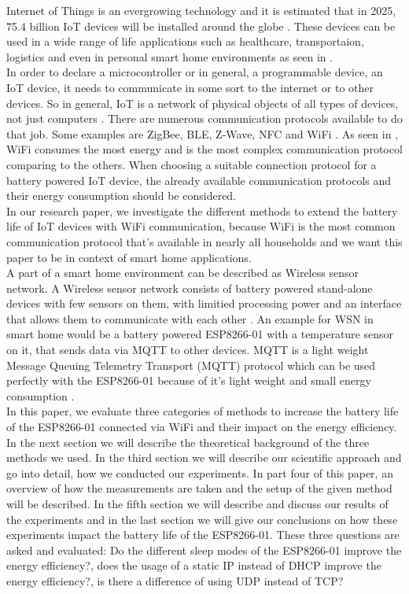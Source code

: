 Internet of Things is an evergrowing technology and it is estimated that in 2025, 75.4 billion IoT devices will be installed around the globe \cite{lucero2016iot}. These devices can be used in a wide range of life applications such as healthcare, transportaion, logistics and even in personal smart home environments as seen in \cite{6803174}.\\  
In order to declare a microcontroller or in general, a programmable device, an IoT device, it needs to communicate in some sort to the internet or to other devices. So in general, IoT is a network of physical objects of all types of devices, not just computers \cite{patel2016internet}. There are numerous communication protocols available to do that job. Some examples are ZigBee, BLE, Z-Wave, NFC and WiFi \cite{8079928}. As seen in \cite{8088226}, WiFi consumes the most energy and is the most complex communication protocol comparing to the others.  
When choosing a suitable connection protocol for a battery powered IoT device, the already available communication protocols and their energy consumption should be considered.\\
In our research paper, we investigate the different methods to extend the battery life of IoT devices with WiFi communication, because WiFi is the most common communication protocol that's available in nearly all households and we want this paper to be in context of smart home applications.\\
A part of a smart home environment can be described as Wireless sensor network. A Wireless sensor network consists of battery powered stand-alone devices with few sensors on them, with limitied processing power and an interface that allows them to communicate with each other \cite{wsn}. 
An example for WSN in smart home would be a battery powered ESP8266-01 with a temperature sensor on it, that sends data via MQTT to other devices.
MQTT is a light weight Message Queuing Telemetry Transport (MQTT) protocol which can be used perfectly with the ESP8266-01 because of it's light weight and small energy consumption \cite{kodali_mqtt_2016}.\\
In this paper, we evaluate three categories of methods to increase the battery life of the ESP8266-01 connected via WiFi and their impact on the energy efficiency.\\
In the next section we will describe the theoretical background of the three methods we used. 
In the third section we will describe our scientific approach and go into detail, how we conducted our experiments.
In part four of this paper, an overview of how the measurements are taken and the setup of the given method will be described.
In the fifth section we will describe and discuss our results of the experiments and in the last section we will give our conclusions on how these experiments impact the battery life of the ESP8266-01.
These three questions are asked and evaluated: Do the different sleep modes of the ESP8266-01 improve the energy efficiency?, does the usage of a static IP instead of DHCP improve the energy efficiency?, is there a difference of using UDP instead of TCP?
